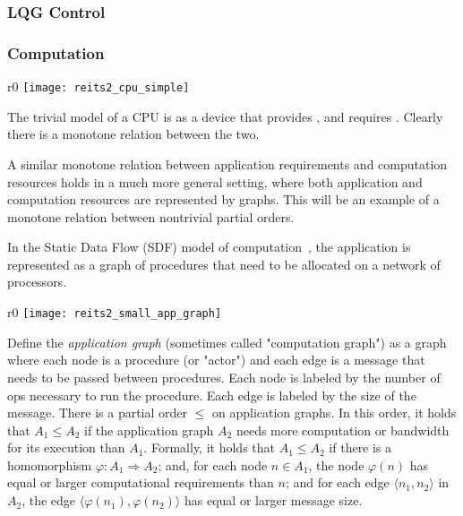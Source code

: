 \clearpage


\subsubsection{LQG Control}




\subsubsection{Computation}

\begin{wrapfigure}{r}{0\columnwidth}
\texttt{[image: reits2\_cpu\_simple]}\caption{}
\end{wrapfigure}
\leavevmode

The trivial model of a CPU is as a device that provides , and requires . Clearly there
is a monotone relation between the two.

A similar monotone relation between application requirements and computation
resources holds in a much more general setting, where both application
and computation resources are represented by graphs. This will be
an example of a monotone relation between nontrivial partial orders.

In the Static Data Flow (SDF) model of computation~\cite[Chapter 3]{sriram00,lee10},
the application is represented as a graph of procedures that need
to be allocated on a network of processors.

\begin{wrapfigure}{r}{0\columnwidth}
\texttt{[image: reits2\_small\_app\_graph]}
\end{wrapfigure}

Define the\emph{ application graph }(sometimes called "computation
graph") as a graph where each node is a procedure (or "actor")
and each edge is a message that needs to be passed between procedures.
Each node is labeled by the number of ops necessary to run the procedure.
Each edge is labeled by the size of the message. There is a partial
order $ \leq$ on application graphs. In this order, it holds that $A_1 \leq A_2$
if the application graph $A_2$ needs more computation or bandwidth
for its execution than $A_1$. Formally, it holds that $A_1 \leq A_2$
if there is a homomorphism $\varphi:A_1  \Rightarrow A_2$; and,
for each node $n∈A_1$, the node $\varphi(n)$ has equal or
larger computational requirements than $n$; and for each edge $⟨n_1,n_2⟩ $
in $A_2$, the edge $⟨\varphi(n_1),\varphi(n_2)⟩ $
has equal or larger message size.

